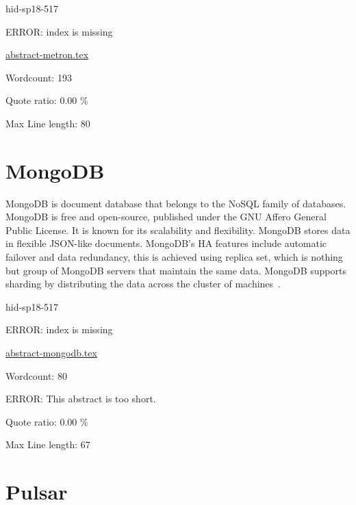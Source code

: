 \begin{IU}

hid-sp18-517

ERROR: index is missing

\href{https://github.com/cloudmesh-community/hid-sp18-517/blob/master//technology/abstract-metron.tex}{abstract-metron.tex}

 

Wordcount: 193


Quote ratio: 0.00 \%
 
Max Line length: 80
\end{IU}

\section{MongoDB}

MongoDB is document database that belongs to the NoSQL family of 
databases. MongoDB is free and open-source, published under the 
GNU Affero General Public License. It is known for its scalability 
and flexibility. MongoDB stores data in flexible JSON-like 
documents. MongoDB's HA features include automatic failover and 
data redundancy, this is achieved using replica set, which is 
nothing but group of MongoDB servers that maintain the same data. 
MongoDB supports sharding by distributing the data across the 
cluster of machines~\cite{hid-sp18-517-MongoDB-intro}.




\begin{IU}

hid-sp18-517

ERROR: index is missing

\href{https://github.com/cloudmesh-community/hid-sp18-517/blob/master//technology/abstract-mongodb.tex}{abstract-mongodb.tex}

 

Wordcount: 80

ERROR: This abstract is too short.


Quote ratio: 0.00 \%
 
Max Line length: 67
\end{IU}

\section{Pulsar}


